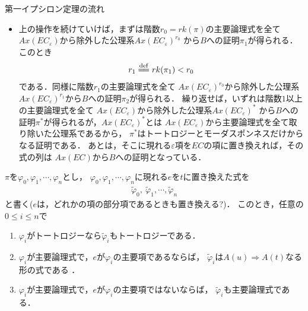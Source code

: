 \begin{itembox}[l]{第一イプシロン定理の流れ}
\begin{itemize}
			\item 上の操作を続けていけば，まずは階数$r_{0} = rk(\pi)$の主要論理式を全て
				$Ax(EC_{\varepsilon})$から除外した公理系$Ax(EC_{\varepsilon})^{r_{0}}$
				から$B$への証明$\pi_{1}$が得られる．このとき
				\begin{align}
					r_{1} \defeq rk(\pi_{1}) < r_{0}
				\end{align}
				である．同様に階数$r_{1}$の主要論理式を全て
				$Ax(EC_{\varepsilon})^{r_{0}}$から除外した公理系
				$Ax(EC_{\varepsilon})^{r_{1}}$から$B$への証明$\pi_{2}$が得られる．
				繰り返せば，いずれは階数$1$以上の主要論理式を全て
				$Ax(EC_{\varepsilon})$から除外した公理系$Ax(EC_{\varepsilon})^{\ast}$
				から$B$への証明$\pi^{\ast}$が得られるが，$Ax(EC_{\varepsilon})^{\ast}$とは
				$Ax(EC_{\varepsilon})$から主要論理式を全て取り除いた公理系であるから，
				$\pi^{\ast}$はトートロジーとモーダスポンネスだけからなる証明である．
				あとは，そこに現れる$\varepsilon$項を$EC$の項に置き換えれば，その式の列は
				$Ax(EC)$から$B$への証明となっている．
		\end{itemize}
	\end{itembox}
	
	$\pi$を$\varphi_{0},\varphi_{1},\cdots,\varphi_{n}$とし，
	$\varphi_{0},\varphi_{1},\cdots,\varphi_{n}$に現れる$e$を$t$に置き換えた式を
	\begin{align}
		\tilde{\varphi}_{0},\ \tilde{\varphi}_{1},\cdots, \tilde{\varphi}_{n}
	\end{align}
	と書く($e$は，どれかの項の部分項であるときも置き換える?)．
	このとき，任意の$0 \leq i \leq n$で
	\begin{enumerate}
		\item $\varphi_{i}$がトートロジーなら$\tilde{\varphi}_{i}$もトートロジーである．
		\item $\varphi_{i}$が主要論理式で，$e$が$\varphi_{i}$の主要項であるならば，
			$\tilde{\varphi}_{i}$は$A(u) \Longrightarrow A(t)$なる形の式である
			\footnotemark．
		\item $\varphi_{i}$が主要論理式で，$e$が$\varphi_{i}$の主要項ではないならば，
			$\tilde{\varphi}_{i}$も主要論理式である．
	\end{enumerate}
	
	

